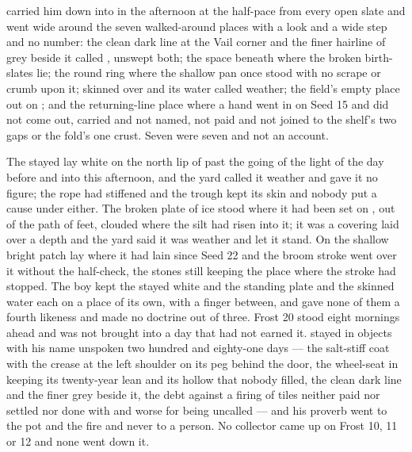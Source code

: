  carried him down into  in the afternoon at the half-pace from every open slate and went wide around the seven walked-around places with a look and a wide step and no number: the clean dark line at the Vail corner and the finer hairline of grey beside it called , unswept both; the space beneath  where the broken birth-slates lie; the round ring where the shallow pan once stood with no scrape or crumb upon it;  skinned over and its water called weather; the field's empty place out on ; and the returning-line place where a hand went in on Seed 15 and did not come out, carried and not named, not paid and not joined to the shelf's two gaps or the fold's one crust. Seven were seven and not an account.

The stayed  lay white on the north lip of  past the going of the light of the day before and into this afternoon, and the yard called it weather and gave it no figure; the rope had stiffened and the trough kept its skin and nobody put a cause under either. The broken plate of ice stood where it had been set on , out of the path of feet, clouded where the silt had risen into it; it was a covering laid over a depth and the yard said it was weather and let it stand. On  the shallow bright patch lay where it had lain since Seed 22 and the broom stroke went over it without the half-check, the stones still keeping the place where the stroke had stopped. The boy kept the stayed white and the standing plate and the skinned water each on a place of its own, with a finger between, and gave none of them a fourth likeness and made no doctrine out of three. Frost 20 stood eight mornings ahead and was not brought into a day that had not earned it.  stayed in objects with his name unspoken two hundred and eighty-one days --- the salt-stiff coat with the crease at the left shoulder on its peg behind the door, the wheel-seat in  keeping its twenty-year lean and its hollow that nobody filled, the clean dark line and the finer grey beside it, the debt against a firing of tiles neither paid nor settled nor done with and worse for being uncalled --- and his proverb went to the pot and the fire and never to a person. No collector came up  on Frost 10, 11 or 12 and none went down it.

\scenebreak

